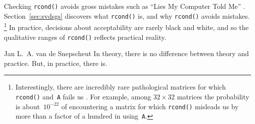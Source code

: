 Checking \verb|rcond()| avoids gross mistakes such as  ``Lies My Computer Told Me'' .
Section~\ref{sec:svdsgs} discovers what \verb|rcond()| is, and why \verb|rcond()| avoids mistakes.%
\footnote{Interestingly, there are incredibly rare pathological matrices for which \texttt{rcond()} and~\texttt{A\slosh} fails us \cite[]{Driscoll07}.  For example, among \(32\times32\) matrices the probability is about~\(10^{-22}\) of encountering a matrix for which \texttt{rcond()} misleads us by more than a factor of a hundred in using~\texttt{A\slosh}.}
In practice, decisions about acceptability are rarely black and white, and so the qualitative ranges of \verb|rcond()| reflects practical reality.

\begin{quoted}{Jan L.~A. van de Snepscheut}
In theory, there is no difference between theory and practice. 
But, in practice, there is. 
\end{quoted}



